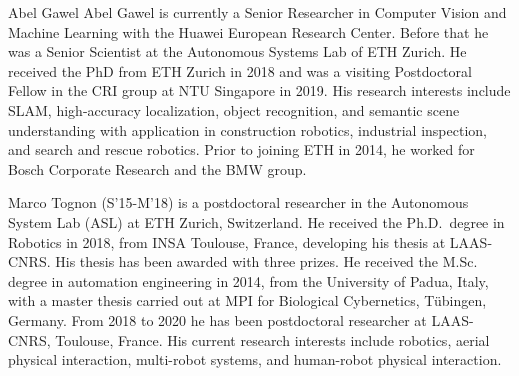 \documentclass[journal]{IEEEtran}  %
\begin{document}
\begin{IEEEbiography}{Abel Gawel} Abel Gawel is currently a Senior Researcher in Computer Vision and Machine Learning with the Huawei European Research Center. Before that he was a Senior Scientist at the Autonomous Systems Lab of ETH Zurich. He received the PhD from ETH Zurich in 2018 and was a visiting Postdoctoral Fellow in the CRI group at NTU Singapore in 2019. His research interests include SLAM, high-accuracy localization, object recognition, and semantic scene understanding with application in construction robotics, industrial inspection, and search and rescue robotics. Prior to joining ETH in 2014, he worked for Bosch Corporate Research and the BMW group.
\end{IEEEbiography}

\begin{IEEEbiography}{Marco Tognon}
(S'15-M'18) is a postdoctoral researcher in the Autonomous System Lab (ASL) at ETH Zurich, Switzerland.
He received the Ph.D.~degree in Robotics in 2018, from INSA Toulouse, France, developing his thesis at LAAS-CNRS.
His thesis has been awarded with three prizes. 
He received the M.Sc. degree in automation engineering in 2014, from the University of Padua, Italy, with a master thesis carried out at MPI for Biological Cybernetics, T\"ubingen, Germany.
From 2018 to 2020 he has been postdoctoral researcher at LAAS-CNRS, Toulouse, France. 
His current research interests include robotics, aerial physical interaction, multi-robot systems, and human-robot physical interaction.
\end{IEEEbiography}
\end{document}
